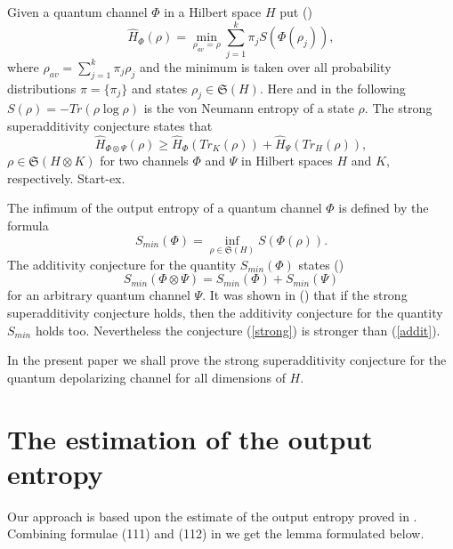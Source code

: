 \documentclass[twocolumn,showpacs,preprintnumbers,amsmath,amssymb]{revtex4}
\begin{document}
Given a quantum channel $\Phi $ in a Hilbert space $H$ put (\cite
{Sh})
\begin {equation}\label {quant}
\hat H_{\Phi}(\rho)=\min \limits _{\rho _{av}=\rho}\sum \limits
_{j=1}^{k}\pi _{j}S(\Phi (\rho _{j})),
\end {equation}
where $\rho _{av}=\sum \limits _{j=1}^{k}\pi _{j}\rho _{j}$ and
the minimum is taken over all probability distributions $\pi
=\{\pi _{j}\}$ and states $\rho _{j}\in \mathfrak{S}(H)$. Here
and in the following $S(\rho)=-Tr(\rho\log \rho)$ is the von
Neumann entropy of a state $\rho $. The strong superadditivity
conjecture states that
\begin {equation}\label {strong}
\hat H_{\Phi \otimes \Psi}(\rho)\ge \hat
H_{\Phi}(Tr_{K}(\rho))+\hat H_{\Psi}(Tr_{H}(\rho)),
\end {equation}
$\rho \in \mathfrak{S}(H\otimes K)$ for two channels $\Phi $ and
$\Psi $ in Hilbert spaces $H$ and $K$, respectively. Start-ex.








The infimum of the output entropy of a quantum channel $\Phi $ is
defined by the formula
\begin {equation}\label {addit}
S_{min}(\Phi)=\inf \limits _{\rho\in \mathfrak{S}(H)}S(\Phi
(\rho)).
\end {equation}
The additivity conjecture for the quantity $S_{min} (\Phi)$ states
(\cite {Hol2})
\begin {equation}\label {conj}
S_{min} (\Phi\otimes \Psi)=S_{min} (\Phi)+S_{min} (\Psi)
\end {equation}
for an arbitrary quantum channel $\Psi $. It was shown in (\cite
{Sh}) that if the strong superadditivity conjecture holds, then
the additivity conjecture for the quantity $S_{min}$ holds too.
Nevertheless the conjecture (\ref {strong}) is stronger than
(\ref {addit}).

In the present paper we shall prove the strong superadditivity
conjecture for the quantum depolarizing channel for all dimensions
of $H$.


\section {The estimation of the output entropy}


Our approach is based upon the estimate of the output entropy
proved in \cite {C02}. Combining formulae (111) and (112) in
\cite {C02} we get the lemma formulated below.
\end{document}
